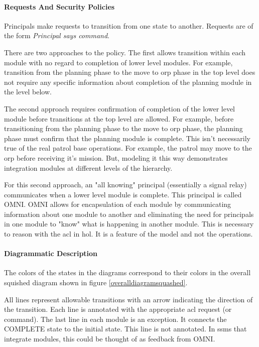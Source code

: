 \documentclass[../../main/main.tex]{subfiles}
\begin{document}
\paragraph*{Requests And Security Policies}
Principals make requests to transition from one state to another.  Requests are of the form \textit{Principal says command}.  

There are two approaches to the policy.  The first allows transition within each module with no regard to completion of lower level modules.  For example, transition from the planning phase to the move to \gls{orp} phase in the top level does not require any specific information about completion of the planning module in the level below.

The second approach requires confirmation of completion of the lower level module before transitions at the top level are allowed.  For example, before transitioning from the planning phase to the move to \gls{orp} phase, the planning phase must confirm that the planning module is complete.   This isn't necessarily true of the real patrol base operations.  For example, the patrol may move to the \gls{orp} before receiving it's mission.  But, modeling it this way demonstrates integration modules at different levels of the hierarchy. 

For this second approach, an "all knowing" principal (essentially a signal relay) communicates when a lower level module is complete.  This principal is called OMNI. OMNI allows for encapsulation of each module by communicating information about one module to another and eliminating the need for principals in one module to "know" what is happening in another module.  This is necessary to reason with the \gls{acl} in \gls{hol}.  It is a feature of the model and not the operations.


\paragraph*{Diagrammatic Description}
The colors of the states in the diagrams correspond to their colors in the overall squished diagram shown in figure \ref{overalldiagramsquashed}.  

All lines represent allowable transitions with an arrow indicating the direction of the transition.  Each line is annotated with the appropriate \gls{acl} request (or command).  The last line in each module is an exception.  It connects the COMPLETE state to the initial state.  This line is not annotated. In \gls{ssm}s that integrate modules, this could be thought of as feedback from OMNI.
\end{document}
